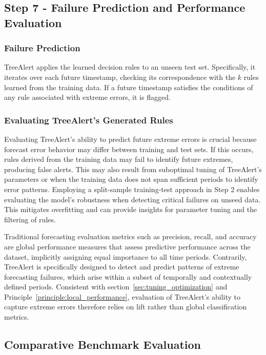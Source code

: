 \documentclass[preprint,12pt]{elsarticle}
\begin{document}
\subsection{Step 7 - Failure Prediction and Performance Evaluation}

\subsubsection{Failure Prediction}

TreeAlert applies the learned decision rules to an unseen test set. Specifically, it iterates over each future timestamp, checking its correspondence with the $k$ rules learned from the training data. If a future timestamp satisfies the conditions of any rule associated with extreme errors, it is flagged.

\subsubsection{Evaluating TreeAlert’s Generated Rules}

Evaluating TreeAlert’s ability to predict future extreme errors is crucial because forecast error behavior may differ between training and test sets. If this occurs, rules derived from the training data may fail to identify future extremes, producing false alerts. This may also result from suboptimal tuning of TreeAlert’s parameters or when the training data does not span sufficient periods to identify error patterns. Employing a split-sample training-test approach in Step 2 enables evaluating the model’s robustness when detecting critical failures on unseed data. This mitigates overfitting and can provide insights for parameter tuning and the filtering of rules. 

Traditional forecasting evaluation metrics such as precision, recall, and accuracy are global performance measures that assess predictive performance across the dataset, implicitly assigning equal importance to all time periods. Contrarily, TreeAlert is specifically designed to detect and predict patterns of extreme forecasting failures, which  arise within a subset of temporally and contextually defined periods. Consistent with section~\ref{sec:tuning_optimization} and Principle~\ref{principle:local_performance}, evaluation of TreeAlert's ability to capture extreme errors therefore relies on lift rather than global classification metrics.


\subsection{Comparative Benchmark Evaluation}
\end{document}
